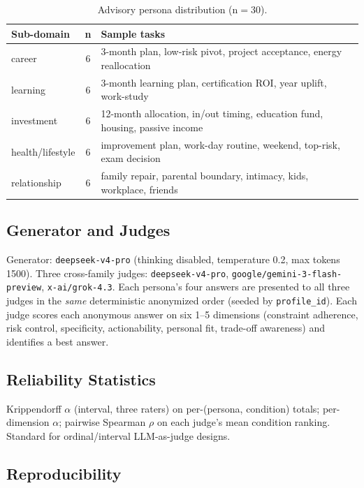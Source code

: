 \documentclass[11pt]{article}
\begin{document}
\begin{table}[h]
\centering
\caption{Advisory persona distribution (n${=}$30).}
\label{tab:dae_personas}
\begin{tabular}{lcl}
\toprule
Sub-domain & n & Sample tasks \\
\midrule
career           & 6 & 3-month plan, low-risk pivot, project acceptance, energy reallocation \\
learning         & 6 & 3-month learning plan, certification ROI, year uplift, work-study \\
investment       & 6 & 12-month allocation, in/out timing, education fund, housing, passive income \\
health/lifestyle & 6 & improvement plan, work-day routine, weekend, top-risk, exam decision \\
relationship     & 6 & family repair, parental boundary, intimacy, kids, workplace, friends \\
\bottomrule
\end{tabular}
\end{table}

\subsection{Generator and Judges}

Generator: \texttt{deepseek-v4-pro} (thinking disabled, temperature 0.2, max tokens 1500). Three cross-family judges: \texttt{deepseek-v4-pro}, \texttt{google/gemini-3-flash-preview}, \texttt{x-ai/grok-4.3}. Each persona's four answers are presented to all three judges in the \emph{same} deterministic anonymized order (seeded by \texttt{profile\_id}). Each judge scores each anonymous answer on six 1--5 dimensions (constraint adherence, risk control, specificity, actionability, personal fit, trade-off awareness) and identifies a best answer.

\subsection{Reliability Statistics}

Krippendorff $\alpha$ (interval, three raters) on per-(persona, condition) totals; per-dimension $\alpha$; pairwise Spearman $\rho$ on each judge's mean condition ranking. Standard for ordinal/interval LLM-as-judge designs.

\subsection{Reproducibility}
\end{document}

